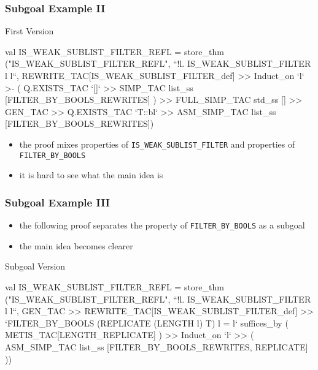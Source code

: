 \begin{frame}[fragile]
\frametitle{Subgoal Example II}

\begin{alertblock}{First Version}
\begin{semiverbatim}\scriptsize
val IS_WEAK_SUBLIST_FILTER_REFL = store_thm ("IS_WEAK_SUBLIST_FILTER_REFL",
  ``!l. IS_WEAK_SUBLIST_FILTER l l``,
REWRITE_TAC[IS_WEAK_SUBLIST_FILTER_def] >>
Induct_on `l` >- (
  Q.EXISTS_TAC `[]` >> 
  SIMP_TAC list_ss [FILTER_BY_BOOLS_REWRITES]
) >>
FULL_SIMP_TAC std_ss [] >>
GEN_TAC >> 
Q.EXISTS_TAC `T::bl` >>
ASM_SIMP_TAC list_ss [FILTER_BY_BOOLS_REWRITES])
\end{semiverbatim}
\end{alertblock}

\begin{itemize}
\item the proof mixes properties of \texttt{IS\_WEAK\_SUBLIST\_FILTER} and
    properties of \texttt{FILTER\_BY\_BOOLS}
\item it is hard to see what the main idea is
\end{itemize}

\end{frame}




\begin{frame}[fragile]
\frametitle{Subgoal Example III}

\begin{itemize}
\item the following proof separates the property of \texttt{FILTER\_BY\_BOOLS} as a subgoal
\item the main idea becomes clearer
\end{itemize}

\begin{exampleblock}{Subgoal Version}
\begin{semiverbatim}\scriptsize
val IS_WEAK_SUBLIST_FILTER_REFL = store_thm ("IS_WEAK_SUBLIST_FILTER_REFL",
  ``!l. IS_WEAK_SUBLIST_FILTER l l``,
GEN_TAC >> 
REWRITE_TAC[IS_WEAK_SUBLIST_FILTER_def] >>
`FILTER_BY_BOOLS (REPLICATE (LENGTH l) T) l = l` suffices_by (
  METIS_TAC[LENGTH_REPLICATE]
) >>
Induct_on `l` >> (
  ASM_SIMP_TAC list_ss [FILTER_BY_BOOLS_REWRITES, REPLICATE]
))
\end{semiverbatim}
\end{exampleblock}
\end{frame}

